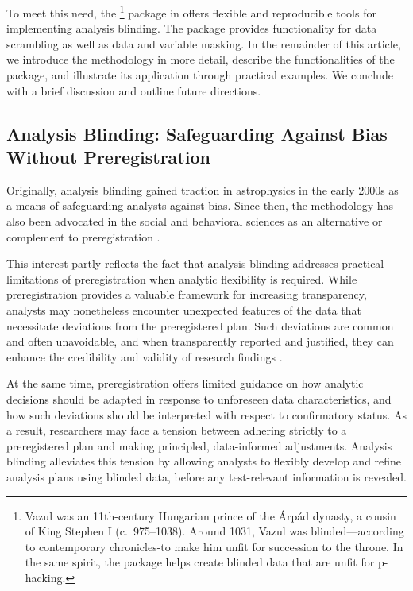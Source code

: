 \documentclass[
]{jss}
\begin{document}
To meet this need, the \footnote{Vazul was an 11th-century
  Hungarian prince of the Árpád dynasty, a cousin of King Stephen I
  (c.~975--1038). Around 1031, Vazul was blinded---according to
  contemporary chronicles-to make him unfit for succession to the
  throne. In the same spirit, the  package helps create
  blinded data that are unfit for p-hacking.} package
\citep{Nagy2026-gb} in  \citep{R2025} offers flexible and
reproducible tools for implementing analysis blinding. The 
package provides functionality for data scrambling as well as data and
variable masking. In the remainder of this article, we introduce the
methodology in more detail, describe the functionalities of the
 package, and illustrate its application through practical
examples. We conclude with a brief discussion and outline future
directions.

\subsection{Analysis Blinding: Safeguarding Against Bias Without
Preregistration}\label{analysis-blinding-safeguarding-against-bias-without-preregistration}

Originally, analysis blinding gained traction in astrophysics in the
early 2000s \citep{maccoun2018psychological} as a means of safeguarding
analysts against bias. Since then, the methodology has also been
advocated in the social and behavioral sciences as an alternative or
complement to preregistration
\citep{dutilh2021blinding, nagy2025bestiary, maccoun2021removebiases, maccoun2015hide, maccoun2018psychological, aczel2020transparency}.

This interest partly reflects the fact that analysis blinding addresses
practical limitations of preregistration when analytic flexibility is
required. While preregistration provides a valuable framework for
increasing transparency, analysts may nonetheless encounter unexpected
features of the data that necessitate deviations from the preregistered
plan. Such deviations are common and often unavoidable, and when
transparently reported and justified, they can enhance the credibility
and validity of research findings
\citep[e.g.,][]{vandenakker2024potential, Lakens2024-tj, Schneider2022-oq, Song2022-em}.

At the same time, preregistration offers limited guidance on how
analytic decisions should be adapted in response to unforeseen data
characteristics, and how such deviations should be interpreted with
respect to confirmatory status. As a result, researchers may face a
tension between adhering strictly to a preregistered plan and making
principled, data-informed adjustments. Analysis blinding alleviates this
tension by allowing analysts to flexibly develop and refine analysis
plans using blinded data, before any test-relevant information is
revealed.
\end{document}
